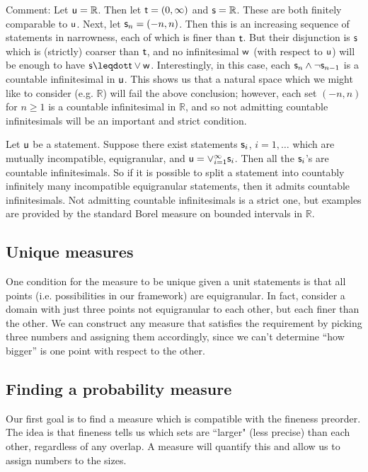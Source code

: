 \documentclass[10pt, onecolumn, longbibliography, nofootinbib]{revtex4-2}
\begin{document}
Comment: Let $\stmt[u] = \mathbb{R}$. Then let $\stmt[t] = (0,\infty)$ and $\stmt = \mathbb{R}$. These are both finitely comparable to $\stmt[u]$. Next, let $\stmt_n = (-n,n)$. Then this is an increasing sequence of statements in narrowness, each of which is finer than $\stmt[t]$. But their disjunction is $\stmt$ which is (strictly) coarser than $\stmt[t]$, and no infinitesimal $\stmt[w]$ (with respect to $\stmt[u]$) will be enough to have $\stmt\finer\stmt[t]\OR \stmt[w]$. Interestingly, in this case, each $\stmt_n\AND\NOT\stmt_{n-1}$ is a countable infinitesimal in $\stmt[u]$. This shows us that a natural space which we might like to consider (e.g. $\mathbb{R}$) will fail the above conclusion; however, each set $(-n,n)$ for $n\geq1$ is a countable infinitesimal in $\mathbb{R}$, and so not admitting countable infinitesimals will be an important and strict condition. 

Let $\stmt[u]$ be a statement. Suppose there exist statements $\stmt_i$, $i=1,\ldots$ which are mutually incompatible, equigranular, and $\stmt[u] = \OR_{i=1}^{\infty}\stmt_i$. Then all the $\stmt_i$'s are countable infinitesimals. So if it is possible to split a statement into countably infinitely many incompatible equigranular statements, then it admits countable infinitesimals. Not admitting countable infinitesimals is a strict one, but examples are provided by the standard Borel measure on bounded intervals in $\mathbb{R}$. 



\subsection{Unique measures}

One condition for the measure to be unique given a unit statements is that all points (i.e. possibilities in our framework) are equigranular. In fact, consider a domain with just three points not equigranular to each other, but each finer than the other. We can construct any measure that satisfies the requirement by picking three numbers and assigning them accordingly, since we can't determine ``how bigger'' is one point with respect to the other.

\subsection{Finding a probability measure}

Our first goal is to find a measure which is compatible with the fineness preorder. The idea is that fineness tells us which sets are ``larger" (less precise) than each other, regardless of any overlap.  A measure will quantify this and allow us to assign numbers to the sizes.
\end{document}
